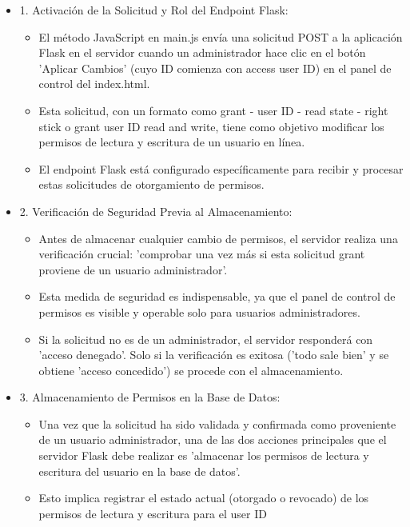 \documentclass{report}
\begin{document}
\begin{itemize}
    \item 1. Activación de la Solicitud y Rol del Endpoint Flask:
        \begin{itemize}
            \item El método JavaScript en main.js envía una solicitud POST a la aplicación Flask en el servidor cuando un administrador 
            hace clic en el botón 'Aplicar Cambios' (cuyo ID comienza con access user ID) en el panel de control del index.html.
            \item Esta solicitud, con un formato como grant - user ID - read state - right stick o grant user ID read and write, tiene como 
            objetivo modificar los permisos de lectura y escritura de un usuario en línea.
            \item El endpoint Flask está configurado específicamente para recibir y procesar estas solicitudes de otorgamiento de permisos.
        \end{itemize}
    \item 2. Verificación de Seguridad Previa al Almacenamiento:
        \begin{itemize}
            \item Antes de almacenar cualquier cambio de permisos, el servidor realiza una verificación crucial: 'comprobar una vez más si 
            esta solicitud grant proviene de un usuario administrador'.
            \item Esta medida de seguridad es indispensable, ya que el panel de control de permisos es visible y operable solo para 
            usuarios administradores.
            \item Si la solicitud no es de un administrador, el servidor responderá con 'acceso denegado'. Solo si la verificación es 
            exitosa ('todo sale bien' y se obtiene 'acceso concedido') se procede con el almacenamiento.
        \end{itemize}
    \item 3. Almacenamiento de Permisos en la Base de Datos:
        \begin{itemize}
            \item Una vez que la solicitud ha sido validada y confirmada como proveniente de un usuario administrador, una de las dos 
            acciones principales que el servidor Flask debe realizar es 'almacenar los permisos de lectura y escritura del usuario 
            en la base de datos'.
            \item Esto implica registrar el estado actual (otorgado o revocado) de los permisos de lectura y escritura para el user ID 

\end{itemize}
\end{itemize}
\end{document}
